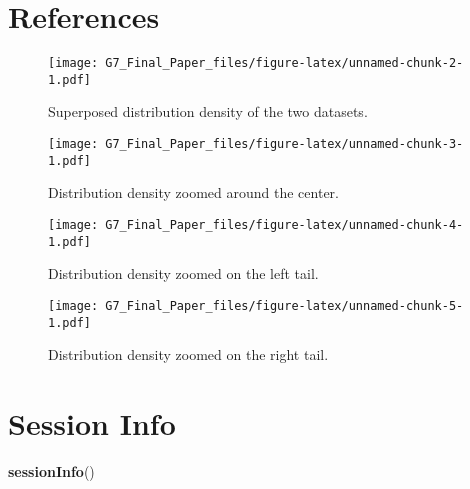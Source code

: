 \documentclass[english,man]{apa6}
\newenvironment{Shaded}{\begin{snugshade}}{\end{snugshade}}
\newcommand{\KeywordTok}[1]{\textcolor[rgb]{0.13,0.29,0.53}{\textbf{{#1}}}}
\newcommand{\NormalTok}[1]{{#1}}
\begin{document}
\newpage

\section{References}\label{references}

\begin{figure}[htbp]
\centering
\texttt{[image: G7\_Final\_Paper\_files/figure-latex/unnamed-chunk-2-1.pdf]}
\caption{\label{fig:unnamed-chunk-2}Superposed distribution density of the
two datasets.}
\end{figure}

\begin{figure}[htbp]
\centering
\texttt{[image: G7\_Final\_Paper\_files/figure-latex/unnamed-chunk-3-1.pdf]}
\caption{\label{fig:unnamed-chunk-3}Distribution density zoomed around the
center.}
\end{figure}

\begin{figure}[htbp]
\centering
\texttt{[image: G7\_Final\_Paper\_files/figure-latex/unnamed-chunk-4-1.pdf]}
\caption{\label{fig:unnamed-chunk-4}Distribution density zoomed on the left
tail.}
\end{figure}

\begin{figure}[htbp]
\centering
\texttt{[image: G7\_Final\_Paper\_files/figure-latex/unnamed-chunk-5-1.pdf]}
\caption{\label{fig:unnamed-chunk-5}Distribution density zoomed on the right
tail.}
\end{figure}

\section{Session Info}\label{session-info}

\begin{Shaded}
\begin{Highlighting}[]
\KeywordTok{sessionInfo}\NormalTok{()}
\end{Highlighting}
\end{Shaded}
\end{document}
